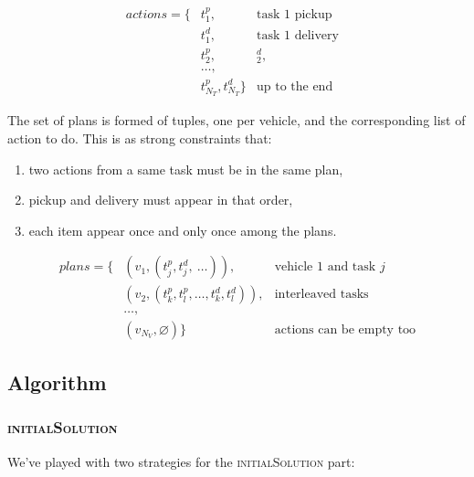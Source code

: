 \documentclass[11pt,a4paper]{article}
\begin{document}
\begin{align*}
actions = \{&t_1^p,                               & \text{task $1$ pickup} \\
            &t_1^d,                               & \text{task $1$ delivery} \\
            &t_2^p, &_2^d,                        & \\
            &\dots,                               & \\
            &t_{N_T}^p, t_{N_T}^d\}               & \text{up to the end}
\end{align*}

The set of plans is formed of tuples, one per vehicle, and the corresponding
list of action to do. This is as strong constraints that:

\begin{enumerate}
    \item two actions from a same task must be in the same plan,

    \item pickup and delivery must appear in that order,

    \item each item appear once and only once among the plans.
\end{enumerate}

\begin{align*}
plans = \{&(v_1, (t_j^p, t_j^d, \: \dots)),            & \text{vehicle $1$ and task $j$} \\
          &(v_2, (t_k^p, t_l^p, \dots, t_k^d, t_l^d)), & \text{interleaved tasks} \\
          &\dots,                                      & \\
          &(v_{N_V}, \varnothing)\}                    & \text{actions can be empty too}
\end{align*}


\subsection*{Algorithm}


\subsubsection*{\textsc{initialSolution}}

We've played with two strategies for the \textsc{initialSolution} part:
\end{document}
